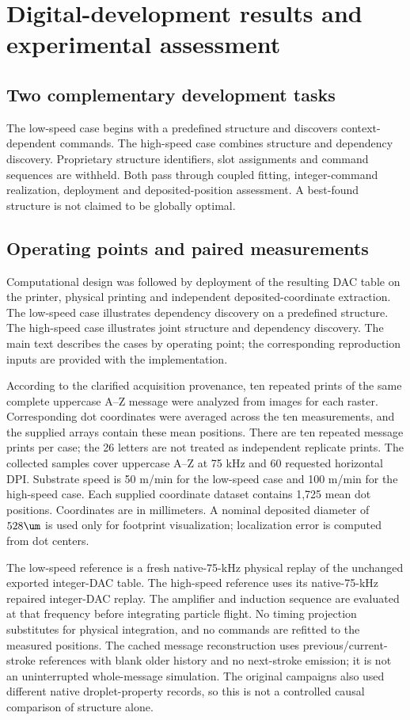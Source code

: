 \section{Digital-development results and experimental assessment}
\label{sec:results}
\label{sec:deposited_assessment}
\subsection{Two complementary development tasks}
The low-speed case begins with a predefined structure and discovers context-dependent commands. The high-speed case combines structure and dependency discovery. Proprietary structure identifiers, slot assignments and command sequences are withheld. Both pass through coupled fitting, integer-command realization, deployment and deposited-position assessment. A best-found structure is not claimed to be globally optimal.



\subsection{Operating points and paired measurements}
Computational design was followed by deployment of the resulting DAC table on the printer, physical printing and independent deposited-coordinate extraction. The low-speed case illustrates dependency discovery on a predefined structure. The high-speed case illustrates joint structure and dependency discovery. The main text describes the cases by operating point; the corresponding reproduction inputs are provided with the implementation.

According to the clarified acquisition provenance, ten repeated prints of the same complete uppercase A--Z message were analyzed from images for each raster. Corresponding dot coordinates were averaged across the ten measurements, and the supplied arrays contain these mean positions. There are ten repeated message prints per case; the 26 letters are not treated as independent replicate prints. The collected samples cover uppercase A--Z at 75 kHz and 60 requested horizontal DPI. Substrate speed is 50 m/min for the low-speed case and 100 m/min for the high-speed case. Each supplied coordinate dataset contains 1,725 mean dot positions. Coordinates are in millimeters. A nominal deposited diameter of $528\um$ is used only for footprint visualization; localization error is computed from dot centers.

The low-speed reference is a fresh native-75-kHz physical replay of the unchanged exported integer-DAC table. The high-speed reference uses its native-75-kHz repaired integer-DAC replay. The amplifier and induction sequence are evaluated at that frequency before integrating particle flight. No timing projection substitutes for physical integration, and no commands are refitted to the measured positions. The cached message reconstruction uses previous/current-stroke references with blank older history and no next-stroke emission; it is not an uninterrupted whole-message simulation. The original campaigns also used different native droplet-property records, so this is not a controlled causal comparison of structure alone.

